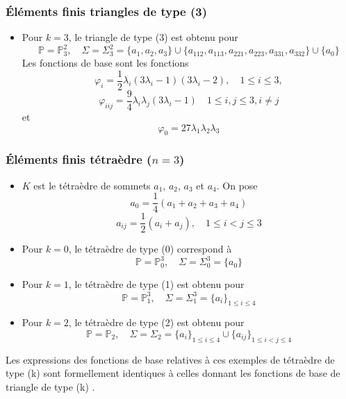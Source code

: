 \documentclass{beamer}
\begin{document}
\begin{frame}
\frametitle{Éléments finis triangles de type (3)}
\begin{itemize}


\item  Pour $k=3$, le triangle de type (3) est obtenu pour
 \[\mathbb{P}=\mathbb{P}_3^2,\quad \Sigma=\Sigma_3^2 = \{a_1,a_2,a_3\}\cup \{a_{112},a_{113},a_{221},a_{223},a_{331},a_{332}\}\cup \{a_{0}\}\]
Les fonctions de base sont les fonctions
\[\varphi_i=\frac 12\lambda_i(3\lambda_i-1)(3\lambda_i-2), \quad 1\leq  i  \leq 3,\] 
\[\varphi_{iij}=\frac 94\lambda_i\lambda_j(3\lambda_i-1) \quad 1\leq  i,j  \leq 3, i\neq j\]
et
  \[\varphi_0 = 27\lambda_1\lambda_2\lambda_3\]
\end{itemize}
\begin{center}
 \end{center}

\end{frame}
\begin{frame}
\frametitle{Éléments finis tétraèdre ($n=3$)}
\begin{itemize}

\item $K$ est le tétraèdre de sommets $a_1$, $a_2$, $a_3$ et $a_4$. On pose
 \[a_0=\frac 14(a_1+a_2+a_3+a_4)\]
 \[a_{ij}=\frac 12(a_i+a_j),\quad 1\leq  i<j  \leq 3\]
\end{itemize}
\begin{itemize}
\item Pour $k=0$, le tétraèdre de type (0) correspond à
\[ \mathbb{P} = \mathbb{P}_0^3, \quad \Sigma=\Sigma_0^3 = \{a_0\}\]


\item  Pour $k = 1$, le tétraèdre de type (1) est obtenu pour
\[\mathbb{P}=\mathbb{P}_1^3,\quad \Sigma=\Sigma_1^3 = \{a_i\}_{1\leq i\leq 4}\]

\item   Pour $k=2$, le tétraèdre de type (2) est obtenu pour
\[\mathbb{P}=\mathbb{P}_2,\quad \Sigma=\Sigma_2 = \{a_i\}_{1\leq i\leq 4}\cup \{a_{ij}\}_{1\leq i<j\leq 4}\]
\end{itemize}
Les expressions des fonctions de base relatives à ces exemples de tétraèdre de type (k) sont formellement identiques à celles donnant les fonctions de base de triangle de type (k) .

\end{frame}
\end{document}
